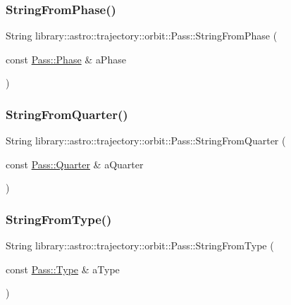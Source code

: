 \subsubsection{\texorpdfstring{String\+From\+Phase()}{StringFromPhase()}}
{\footnotesize\ttfamily String library\+::astro\+::trajectory\+::orbit\+::\+Pass\+::\+String\+From\+Phase (\begin{DoxyParamCaption}\item[{const \hyperlink{classlibrary_1_1astro_1_1trajectory_1_1orbit_1_1_pass_ae0ff0630d4ad5cd97aa3efbc8c8f368b}{Pass\+::\+Phase} \&}]{a\+Phase }\end{DoxyParamCaption})\hspace{0.3cm}{\ttfamily [static]}}

\mbox{\label{classlibrary_1_1astro_1_1trajectory_1_1orbit_1_1_pass_a4c00ed82189f0dd1fba4d1147e916e1e}} 
\subsubsection{\texorpdfstring{String\+From\+Quarter()}{StringFromQuarter()}}
{\footnotesize\ttfamily String library\+::astro\+::trajectory\+::orbit\+::\+Pass\+::\+String\+From\+Quarter (\begin{DoxyParamCaption}\item[{const \hyperlink{classlibrary_1_1astro_1_1trajectory_1_1orbit_1_1_pass_a70c718878e83f059e65788c323eb7900}{Pass\+::\+Quarter} \&}]{a\+Quarter }\end{DoxyParamCaption})\hspace{0.3cm}{\ttfamily [static]}}

\mbox{\label{classlibrary_1_1astro_1_1trajectory_1_1orbit_1_1_pass_ab7983b8918e73295ba33ab80892a06c4}} 
\subsubsection{\texorpdfstring{String\+From\+Type()}{StringFromType()}}
{\footnotesize\ttfamily String library\+::astro\+::trajectory\+::orbit\+::\+Pass\+::\+String\+From\+Type (\begin{DoxyParamCaption}\item[{const \hyperlink{classlibrary_1_1astro_1_1trajectory_1_1orbit_1_1_pass_aa2a63a39c759bf96a0cc62a6ed3d2ceb}{Pass\+::\+Type} \&}]{a\+Type }\end{DoxyParamCaption})\hspace{0.3cm}{\ttfamily [static]}}

